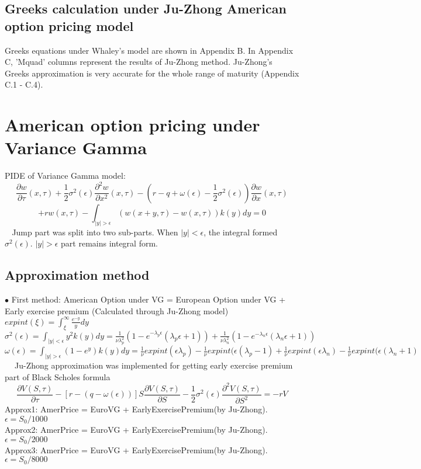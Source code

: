 \documentclass[preprint,12pt,1p]{elsarticle}
\begin{document}
\begin{spacing}{1.5}
\subsection{Greeks calculation under Ju-Zhong American option pricing model}
\label{subsec3}
Greeks equations under Whaley's model are shown in Appendix B. In Appendix C, 'Mquad' columns represent the results of Ju-Zhong method. Ju-Zhong's Greeks approximation is very accurate for the whole range of maturity (Appendix C.1 - C.4).

\section{American option pricing under Variance Gamma}
\label{sec3}
PIDE of Variance Gamma model:
$$\frac{\partial{w}}{\partial{\tau}}(x,\tau) + \frac{1}{2}\sigma^2(\epsilon)\frac{\partial^2{w}}{\partial{x^2}}(x,\tau) -\left( r - q + \omega(\epsilon) - \frac{1}{2}\sigma^2(\epsilon) \right)\frac{\partial{w}}{\partial{x}}(x,\tau) $$$$+rw(x,\tau) - \int_{|y| > \epsilon} \left(w(x+y,\tau) - w(x,\tau)\right)k(y)dy = 0 $$
$~~~~$Jump part was split into two sub-parts. When $|y| < \epsilon$, the integral formed $\sigma^2(\epsilon)$. $|y| > \epsilon$ part remains integral form. \\

\subsection{Approximation method}
\label{subsec1}

$\bullet$ First method: American Option under VG = European Option under VG + Early exercise premium (Calculated through Ju-Zhong model)\\
$expint(\xi) = \int_{\xi}^{\infty} \frac{e^{-y}}{y} dy$\\[6pt]
$ \sigma^2(\epsilon) = \int_{|y| < \epsilon} y^2 k(y)dy = \frac{1}{\nu \lambda^2_p}\left(1-e^{-\lambda_p\epsilon}(\lambda_p \epsilon+1)\right)+\frac{1}{\nu \lambda^2_n}\left(1-e^{-\lambda_n\epsilon}(\lambda_n \epsilon+1)\right)$\\[6pt]
$\omega(\epsilon) = \int_{|y| > \epsilon} (1-e^y)k(y)dy =  \frac{1}{\nu}expint(\epsilon \lambda_p) -  \frac{1}{\nu}expint(\epsilon (\lambda_p -1) +  \frac{1}{\nu}expint(\epsilon \lambda_n) -  \frac{1}{\nu}expint(\epsilon (\lambda_n +1)$\\[6pt]
$~~~~$ Ju-Zhong approximation was implemented for getting early exercise premium part of Black Scholes formula $$\frac{\partial V(S,\tau)}{\partial \tau} - [r-(q-\omega(\epsilon))]S\frac{\partial V(S,\tau)}{\partial S} - \frac{1}{2} \sigma^2(\epsilon)\frac{\partial^2 V(S,\tau)}{\partial S^2}  = -rV$$
Approx1: AmerPrice = EuroVG + EarlyExercisePremium(by Ju-Zhong). $\epsilon = S_0/1000$\\
Approx2: AmerPrice = EuroVG + EarlyExercisePremium(by Ju-Zhong). $\epsilon = S_0/2000$\\
Approx3: AmerPrice = EuroVG + EarlyExercisePremium(by Ju-Zhong). $\epsilon = S_0/8000$\\


\end{spacing}
\end{document}
